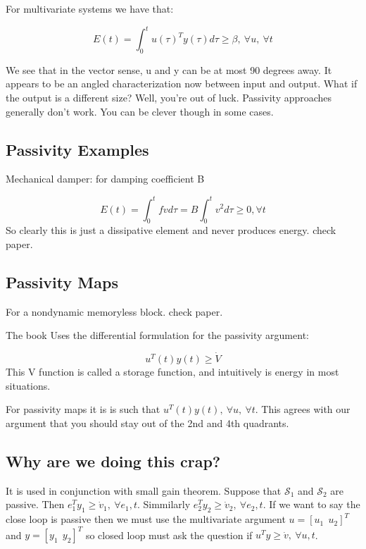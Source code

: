 \documentclass[11pt]{article}
\begin{document}
For multivariate systems we have that:

 \begin{equation}
E(t) = \int_0^t u(\tau)^Ty(\tau) d\tau \geq \beta, \ \forall u, \ \forall t
\end{equation}

We see that in the vector sense, u and y can be at most 90 degrees away. It appears to be an angled characterization now between input and output. What if the output is a different size? Well, you're out of luck. Passivity approaches generally don't work. You can be clever though in some cases.

\subsection*{Passivity Examples}
Mechanical damper: for damping coefficient B

\begin{equation}
	E(t) = \int_0^t f v d\tau = B \int_0^t v^2 d\tau \geq 0, \forall t
\end{equation}
So clearly this is just a dissipative element and never produces energy.
 check paper.


\subsection*{Passivity Maps}
 For a nondynamic memoryless block.  check paper.



 The book Uses the differential formulation for the passivity argument:

\begin{equation}
 	u^T(t)y(t) \geq \dot{V}
\end{equation}
This V function is called a storage function, and intuitively is energy in most situations.

For passivity maps it is is such that $u^T(t)y(t), \ \forall u, \ \forall t$. This agrees with our argument that you should stay out of the 2nd and 4th quadrants.


\subsection*{Why are we doing this crap?} %
\label{sub:why_are_we_doing_this_crap_}
It is used in conjunction with small gain theorem. Suppose that $\mathcal{S}_1$ and $\mathcal{S}_2$ are passive. Then $e_1^Ty_1 \geq \dot{v}_1,\ \forall e_1,t$. Simmilarly $e_2^Ty_2 \geq \dot{v}_2,\ \forall e_2,t$. If we want to say the close loop is passive then we must use the multivariate argument $u = [u_1 \ \ u_2]^T$ and $y = [y_1 \ \ y_2]^T$ so closed loop must ask the question if $u^Ty \geq \dot{v}, \ \forall u,t$.
\end{document}
